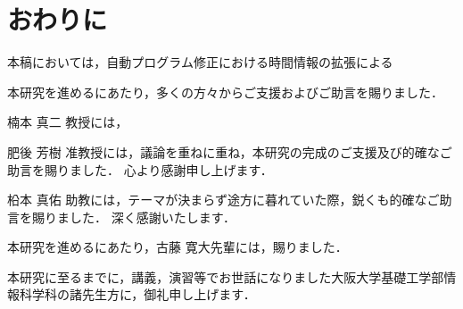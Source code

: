 \documentclass[uplatex,dvipdfmx,a4paper]{jsarticle}
\begin{document}
\clearpage
\section{おわりに}
本稿においては，自動プログラム修正における時間情報の拡張による

\clearpage
\acknowledgement

本研究を進めるにあたり，多くの方々からご支援およびご助言を賜りました．

楠本 真二 教授には，

肥後 芳樹 准教授には，議論を重ねに重ね，本研究の完成のご支援及び的確なご助言を賜りました．
心より感謝申し上げます．

柗本 真佑 助教には，テーマが決まらず途方に暮れていた際，鋭くも的確なご助言を賜りました．
深く感謝いたします．

本研究を進めるにあたり，古藤 寛大先輩には，賜りました．

本研究に至るまでに，講義，演習等でお世話になりました大阪大学基礎工学部情報科学科の諸先生方に，御礼申し上げます．

\clearpage


\end{document}
